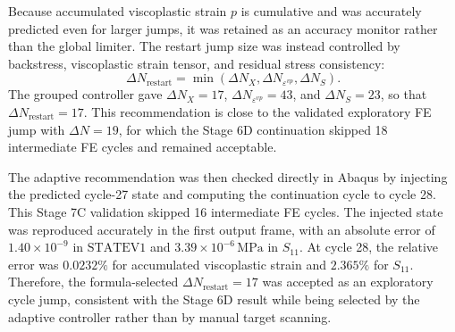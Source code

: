Because accumulated viscoplastic strain \(p\) is cumulative and was accurately predicted even for larger jumps, it was retained as an accuracy monitor rather than the global limiter. The restart jump size was instead controlled by backstress, viscoplastic strain tensor, and residual stress consistency:
\begin{equation}
\Delta N_{\mathrm{restart}} =
\min\left(\Delta N_X,\Delta N_{\varepsilon^{vp}},\Delta N_S\right).
\end{equation}
The grouped controller gave \(\Delta N_X=17\), \(\Delta N_{\varepsilon^{vp}}=43\), and \(\Delta N_S=23\), so that \(\Delta N_{\mathrm{restart}}=17\). This recommendation is close to the validated exploratory FE jump with \(\Delta N=19\), for which the Stage 6D continuation skipped 18 intermediate FE cycles and remained acceptable.

The adaptive recommendation was then checked directly in Abaqus by injecting the predicted cycle-27 state and computing the continuation cycle to cycle 28. This Stage 7C validation skipped 16 intermediate FE cycles. The injected state was reproduced accurately in the first output frame, with an absolute error of \(1.40\times10^{-9}\) in \(\text{STATEV1}\) and \(3.39\times10^{-6}\,\mathrm{MPa}\) in \(S_{11}\). At cycle 28, the relative error was \(0.0232\%\) for accumulated viscoplastic strain and \(2.365\%\) for \(S_{11}\). Therefore, the formula-selected \(\Delta N_{\mathrm{restart}}=17\) was accepted as an exploratory cycle jump, consistent with the Stage 6D result while being selected by the adaptive controller rather than by manual target scanning.

\begin{table}[htbp]
\centering
\small
{}
\caption{Final cycle-jump validation summary. Stage 7B provides the grouped adaptive recommendation, while Stage 7C validates that recommendation through a direct Abaqus continuation run.}
\label{tab:final_cycle_jump_summary}
\end{table}

